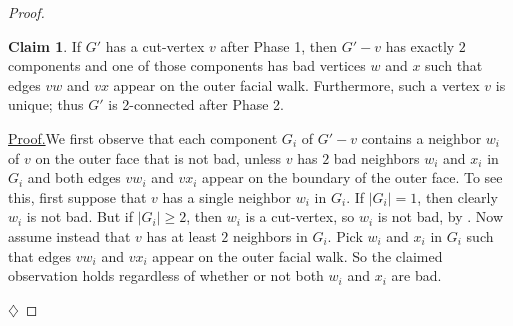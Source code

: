 \documentclass[11pt]{article}
\theoremstyle{definition}
\newtheorem{clmA}{Claim}
\renewcommand\ge\geqslant
\newenvironment{clmproof}[1]{\par\noindent\underline{Proof.}\space#1}{\leavevmode\unskip\penalty9999\hbox{}\nobreak\hfill\quad\hbox{$\diamondsuit$}\smallskip}
\begin{document}
\begin{proof}

    \begin{clmA}
    \label{subclaim3}
    	If $G'$ has a cut-vertex $v$ after Phase 1, then $G'-v$ has exactly $2$ components and one of those components has bad vertices $w$ and $x$
	such that edges $vw$ and $vx$ appear on the outer facial walk.  Furthermore, such a vertex $v$ is unique; thus $G'$ is 2-connected after Phase 2.
    \end{clmA}  
	\begin{clmproof}
		We first observe that each component $G_i$ of $G'-v$ contains a neighbor $w_i$ of $v$ on the outer face that is not bad, unless $v$ has
		$2$ bad neighbors $w_i$ and $x_i$ in $G_i$ and both edges $vw_i$ and $vx_i$ appear on the boundary of the outer face.  To see this,
		first suppose that $v$ has a single neighbor $w_i$ in $G_i$.  If $|G_i|=1$, then clearly $w_i$ is not bad.  But if $|G_i|\ge 2$, then
		$w_i$ is a cut-vertex, so $w_i$ is not bad, by .  Now assume instead that $v$ has at least $2$ neighbors in $G_i$.  Pick $w_i$
		and $x_i$ in $G_i$ such that edges $vw_i$ and $vx_i$ appear on the outer facial walk.  So the claimed observation holds regardless
		of whether or not both $w_i$ and $x_i$ are bad.


\end{clmproof}
\end{proof}
\end{document}
